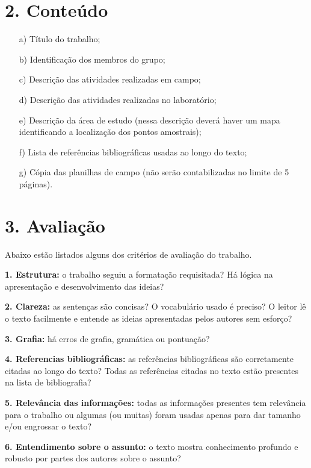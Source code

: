 \documentclass[a4paper,10pt]{article}
\begin{document}
  \section* {2. Conteúdo }
    \noindent
  \begin{itemize}
    \item[a)] Título do trabalho;
    \item[b)] Identificação dos membros do grupo;
    \item[c)] Descrição das atividades realizadas em campo;
    \item[d)] Descrição das atividades realizadas no laboratório;
    \item[e)] Descrição da área de estudo (nessa descrição deverá haver um mapa identificando a localização dos pontos amostrais);
    \item[f)] Lista de referências bibliográficas usadas ao longo do texto;
    \item[g)] Cópia das planilhas de campo (não serão contabilizadas no limite de 5 páginas).
  \end{itemize}
  
  \section* {3. Avaliação}

    Abaixo estão listados alguns dos critérios de avaliação do trabalho.

    \textbf{1. Estrutura:} o trabalho seguiu a formatação requisitada? Há lógica na apresentação e desenvolvimento das ideias?

    \textbf{2. Clareza:} as sentenças são concisas? O vocabulário usado é preciso? O leitor lê o texto facilmente e entende as ideias apresentadas pelos autores sem esforço?

    \textbf{3. Grafia:} há erros de grafia, gramática ou pontuação?

    \textbf{4. Referencias bibliográficas:} as referências bibliográficas são corretamente citadas ao longo do texto? Todas as referências citadas no texto estão presentes na lista de bibliografia?

    \textbf{5. Relevância das informações:} todas as informações presentes tem relevância para o trabalho ou algumas (ou muitas) foram usadas apenas para dar tamanho e/ou engrossar o texto?

    \textbf{6. Entendimento sobre o assunto:} o texto mostra conhecimento profundo e robusto por partes dos autores sobre o assunto?

  \clearpage %
\end{document}
